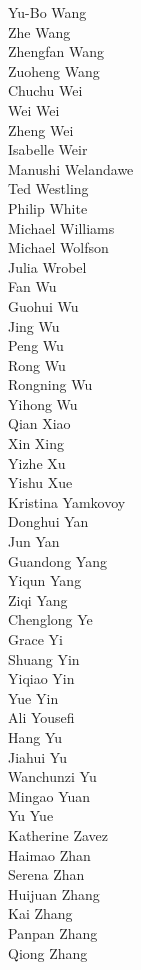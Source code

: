 Yu-Bo Wang\\
Zhe Wang\\
Zhengfan Wang\\
Zuoheng Wang\\
Chuchu Wei\\
Wei Wei\\
Zheng Wei\\
Isabelle Weir\\
Manushi Welandawe\\
Ted Westling\\
Philip White\\
Michael Williams\\
Michael Wolfson\\
Julia Wrobel\\
Fan Wu\\
Guohui Wu\\
Jing Wu\\
Peng Wu\\
Rong Wu\\
Rongning Wu\\
Yihong Wu\\
Qian Xiao\\
Xin Xing\\
Yizhe Xu\\
Yishu Xue\\
Kristina Yamkovoy\\
Donghui Yan\\
Jun Yan\\
Guandong Yang\\
Yiqun Yang\\
Ziqi Yang\\
Chenglong Ye\\
Grace Yi\\
Shuang Yin\\
Yiqiao Yin\\
Yue Yin\\
Ali Yousefi\\
Hang Yu\\
Jiahui Yu\\
Wanchunzi Yu\\
Mingao Yuan\\
Yu Yue\\
Katherine Zavez\\
Haimao Zhan\\
Serena Zhan\\
Huijuan Zhang\\
Kai Zhang\\
Panpan Zhang\\
Qiong Zhang\\
